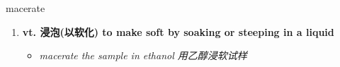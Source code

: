 
\begin{frame}
{\huge macerate}
\begin{center}
\begin{enumerate}\Large
  \item \textbf{vt. 浸泡(以软化) to make soft by soaking or steeping in a liquid}
  \begin{itemize}
    \item \em{\Large{macerate the sample in ethanol 用乙醇浸软试样}}
  \end{itemize}
\end{enumerate}
\end{center}
\end{frame}
